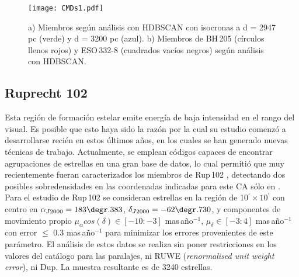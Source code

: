 \documentclass[baaa]{baaa}
\begin{document}
\begin{figure}[!t]
\centering
\texttt{[image: CMDs1.pdf]}
\caption{a) Miembros seg\'un an\'alisis con {\sc HDBSCAN} con isocronas a d = 2947 pc (verde) y d = 3200 pc (azul). b) Miembros de BH\,205 (c\'irculos llenos rojos) y ESO\,332-8 (cuadrados vac\'ios negros) seg\'un an\'alisis con {\sc HDBSCAN}.}
\label{aju}
\end{figure}


\subsection{Ruprecht 102}
	\label{rup102dss}

Esta regi\'on de formaci\'on estelar emite energ\'ia de baja intensidad en el rango del visual. Es posible que esto haya sido la raz\'on por la cual su estudio comenz\'o a desarrollarse reci\'en en estos \'ultimos a\~nos, en los cuales se han generado nuevas t\'ecnicas de trabajo. Actualmente, se emplean c\'odigos capaces de encontrar agrupaciones de estrellas en una gran base de datos, lo cual permiti\'o que muy recientemente fueran caracterizados los miembros de Rup\,102 \citep{2019liu,2020cg}, detectando dos posibles sobredensidades en las coordenadas indicadas para este CA sólo en \cite{2019liu}. 
Para el estudio de Rup\,102 se consideran estrellas en la regi\'on de 10$^{\prime}\times10^{\prime}$ con centro en $\alpha_{J2000}=183\degr.383$, $\delta_{J2000}=-62\degr.730$, y componentes de movimiento propio $\mu_{\alpha}cos(\delta)\in[-10:-3]$ mas\,a\~no$^{-1}$, $\mu_{\delta}\in[-3:4]$ mas\,a\~no$^{-1}$ con error 
$\leq$ 0.3 mas\,a\~no$^{-1}$ para minimizar los errores provenientes de este par\'ametro. El an\'alisis de estos datos se realiza sin poner restricciones en los valores del cat\'alogo para las paralajes, ni RUWE ({\em renormalised unit weight error}), ni Dup. La muestra resultante es de 3240 estrellas.

\end{document}
